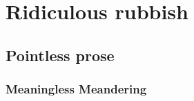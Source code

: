 \documentclass[../main]{subfiles}
\begin{document}
\section{Ridiculous rubbish}
\subsection{Pointless prose}
\subsubsection{Meaningless Meandering}
\blindtext
\end{document}
